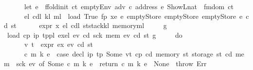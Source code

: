 \begin{isabellebody}
\ \ \ \ \ \ let\ e{\isacharprime}{\kern0pt}\ {\isacharequal}{\kern0pt}\ ffold{\isacharunderscore}{\kern0pt}init\ ct\ {\isacharparenleft}{\kern0pt}emptyEnv\ adv\ c\ {\isacharparenleft}{\kern0pt}address\ e{\isacharparenright}{\kern0pt}\ {\isacharparenleft}{\kern0pt}ShowL\isactrlsub n\isactrlsub a\isactrlsub t\ {}{\isacharparenright}{\kern0pt}{\isacharparenright}{\kern0pt}\ {\isacharparenleft}{\kern0pt}fmdom\ ct{\isacharparenright}{\kern0pt}{\isacharsemicolon}{\kern0pt}\isanewline
\ \ \ \ \ \ {\isacharparenleft}{\kern0pt}e\isactrlsub l{\isacharcomma}{\kern0pt}\ cd\isactrlsub l{\isacharcomma}{\kern0pt}\ k\isactrlsub l{\isacharcomma}{\kern0pt}\ m\isactrlsub l{\isacharparenright}{\kern0pt}\ {\isasymleftarrow}\ load\ True\ fp\ xe\ e{\isacharprime}{\kern0pt}\ emptyStore\ emptyStore\ emptyStore\ e\ cd\ st{\isacharsemicolon}{\kern0pt}\isanewline
\ \ \ \ \ \ expr\ x\ e\isactrlsub l\ cd\isactrlsub l\ {\isacharparenleft}{\kern0pt}st{\isasymlparr}stack{\isacharcolon}{\kern0pt}{\isacharequal}{\kern0pt}k\isactrlsub l{\isacharcomma}{\kern0pt}\ memory{\isacharcolon}{\kern0pt}{\isacharequal}{\kern0pt}m\isactrlsub l{\isasymrparr}{\isacharparenright}{\kern0pt}\isanewline
\ \ \ \ {\isacharbraceright}{\kern0pt}{\isacharparenright}{\kern0pt}\ g{\isachardoublequoteclose}\isanewline
{\isacharbar}{\kern0pt}\ {\isachardoublequoteopen}load\ cp\ {\isacharparenleft}{\kern0pt}{\isacharparenleft}{\kern0pt}i\isactrlsub p{\isacharcomma}{\kern0pt}\ t\isactrlsub p{\isacharparenright}{\kern0pt}{\isacharhash}{\kern0pt}pl{\isacharparenright}{\kern0pt}\ {\isacharparenleft}{\kern0pt}ex{\isacharhash}{\kern0pt}el{\isacharparenright}{\kern0pt}\ e\isactrlsub v{\isacharprime}{\kern0pt}\ cd{\isacharprime}{\kern0pt}\ sck{\isacharprime}{\kern0pt}\ mem{\isacharprime}{\kern0pt}\ e\isactrlsub v\ cd\ st\ g\ {\isacharequal}{\kern0pt}\isanewline
\ \ \ \ {\isacharparenleft}{\kern0pt}do\ {\isacharbraceleft}{\kern0pt}\isanewline
\ \ \ \ \ \ {\isacharparenleft}{\kern0pt}v{\isacharcomma}{\kern0pt}\ t{\isacharparenright}{\kern0pt}\ {\isasymleftarrow}\ expr\ ex\ e\isactrlsub v\ cd\ st{\isacharsemicolon}{\kern0pt}\isanewline
\ \ \ \ \ \ {\isacharparenleft}{\kern0pt}c{\isacharcomma}{\kern0pt}\ m{\isacharcomma}{\kern0pt}\ k{\isacharcomma}{\kern0pt}\ e{\isacharparenright}{\kern0pt}\ {\isasymleftarrow}\ case\ decl\ i\isactrlsub p\ t\isactrlsub p\ {\isacharparenleft}{\kern0pt}Some\ {\isacharparenleft}{\kern0pt}v{\isacharcomma}{\kern0pt}t{\isacharparenright}{\kern0pt}{\isacharparenright}{\kern0pt}\ cp\ cd\ {\isacharparenleft}{\kern0pt}memory\ st{\isacharparenright}{\kern0pt}\ {\isacharparenleft}{\kern0pt}storage\ st{\isacharparenright}{\kern0pt}\ {\isacharparenleft}{\kern0pt}cd{\isacharprime}{\kern0pt}{\isacharcomma}{\kern0pt}\ mem{\isacharprime}{\kern0pt}{\isacharcomma}{\kern0pt}\ \ sck{\isacharprime}{\kern0pt}{\isacharcomma}{\kern0pt}\ e\isactrlsub v{\isacharprime}{\kern0pt}{\isacharparenright}{\kern0pt}\ of\ Some\ {\isacharparenleft}{\kern0pt}c{\isacharcomma}{\kern0pt}\ m{\isacharcomma}{\kern0pt}\ k{\isacharcomma}{\kern0pt}\ e{\isacharparenright}{\kern0pt}\ {\isasymRightarrow}\ return\ {\isacharparenleft}{\kern0pt}c{\isacharcomma}{\kern0pt}\ m{\isacharcomma}{\kern0pt}\ k{\isacharcomma}{\kern0pt}\ e{\isacharparenright}{\kern0pt}\ {\isacharbar}{\kern0pt}\ None\ {\isasymRightarrow}\ throw\ Err{\isacharsemicolon}{\kern0pt}\isanewline

\end{isabellebody}
